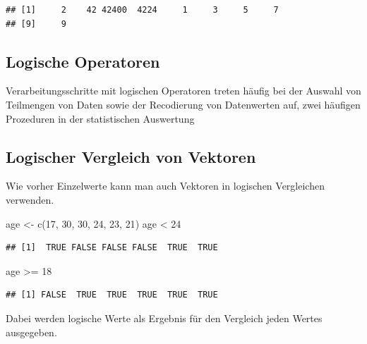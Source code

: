 \documentclass[
]{book}
\newenvironment{Shaded}{\begin{snugshade}}{\end{snugshade}}
\newcommand{\DecValTok}[1]{\textcolor[rgb]{0.00,0.00,0.81}{#1}}
\newcommand{\FunctionTok}[1]{\textcolor[rgb]{0.00,0.00,0.00}{#1}}
\newcommand{\NormalTok}[1]{#1}
\newcommand{\OtherTok}[1]{\textcolor[rgb]{0.56,0.35,0.01}{#1}}
\newcommand{\SpecialCharTok}[1]{\textcolor[rgb]{0.00,0.00,0.00}{#1}}
\begin{document}
\begin{verbatim}
## [1]     2    42 42400  4224     1     3     5     7
## [9]     9
\end{verbatim}

\hypertarget{logische-operatoren}{%
\subsection{Logische Operatoren}\label{logische-operatoren}}

Verarbeitungsschritte mit logischen Operatoren treten häufig bei der Auswahl von Teilmengen von Daten
sowie der Recodierung von Datenwerten auf, zwei häufigen Prozeduren in der statistischen Auswertung

\hypertarget{logischer-vergleich-von-vektoren}{%
\subsection{Logischer Vergleich von Vektoren}\label{logischer-vergleich-von-vektoren}}

Wie vorher Einzelwerte kann man auch Vektoren in logischen Vergleichen verwenden.

\begin{Shaded}
\begin{Highlighting}[]
\NormalTok{age }\OtherTok{\textless{}{-}} \FunctionTok{c}\NormalTok{(}\DecValTok{17}\NormalTok{, }\DecValTok{30}\NormalTok{, }\DecValTok{30}\NormalTok{, }\DecValTok{24}\NormalTok{, }\DecValTok{23}\NormalTok{, }\DecValTok{21}\NormalTok{)}
\NormalTok{age }\SpecialCharTok{\textless{}} \DecValTok{24}
\end{Highlighting}
\end{Shaded}

\begin{verbatim}
## [1]  TRUE FALSE FALSE FALSE  TRUE  TRUE
\end{verbatim}

\begin{Shaded}
\begin{Highlighting}[]
\NormalTok{age }\SpecialCharTok{\textgreater{}=} \DecValTok{18}
\end{Highlighting}
\end{Shaded}

\begin{verbatim}
## [1] FALSE  TRUE  TRUE  TRUE  TRUE  TRUE
\end{verbatim}

Dabei werden logische Werte als Ergebnis für den Vergleich jeden Wertes ausgegeben.
\end{document}
